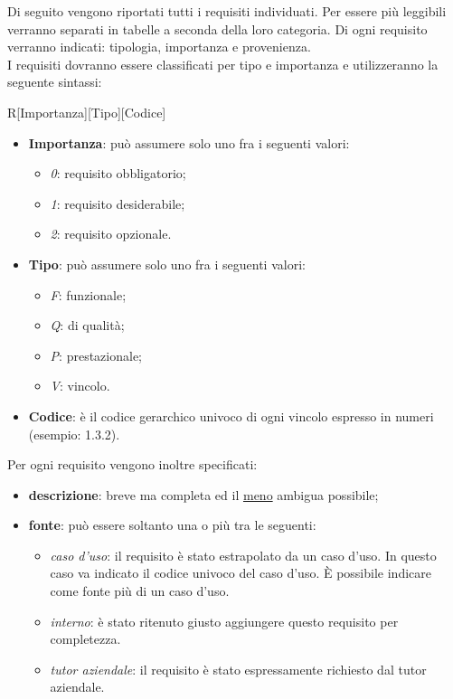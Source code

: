 	Di seguito vengono riportati tutti i requisiti individuati. Per essere più leggibili verranno separati in tabelle a seconda della loro categoria. Di ogni requisito verranno indicati: tipologia, importanza e provenienza.\\
	I requisiti dovranno essere classificati per tipo e importanza e utilizzeranno la seguente sintassi:
	\begin{center}
		R[Importanza][Tipo][Codice]
	\end{center}
	\begin{itemize}
		\item \textbf{Importanza}: può assumere solo uno fra i seguenti valori:
		\begin{itemize}
			\item \textit{0}: requisito obbligatorio;
			\item \textit{1}: requisito desiderabile;
			\item \textit{2}: requisito opzionale.
		\end{itemize}
		\item \textbf{Tipo}: pu\`{o} assumere solo uno fra i seguenti valori:
		\begin{itemize}
			\item  \textit{F}: funzionale;
			\item  \textit{Q}: di qualità;
			\item  \textit{P}: prestazionale;
			\item  \textit{V}: vincolo.
		\end{itemize}
		\item \textbf{Codice}: è il codice gerarchico univoco di ogni vincolo espresso in numeri (esempio: 1.3.2).
	\end{itemize}
	
	Per ogni requisito vengono inoltre specificati:
	\begin{itemize}
		\item \textbf{descrizione}: breve ma completa ed il \underline{meno} ambigua possibile;
		\item \textbf{fonte}: pu\`{o} essere soltanto una o pi\`{u} tra le seguenti:
		\begin{itemize}
			\item \textit{caso d'uso}: il requisito \`{e} stato estrapolato da un caso d'uso. In questo caso va indicato il codice univoco del caso d'uso. \`{E} possibile indicare come fonte pi\`{u} di un caso d'uso.
			\item \textit{interno}: è stato ritenuto giusto aggiungere questo requisito per completezza.
			\item \textit{tutor aziendale}: il requisito è stato espressamente richiesto dal tutor aziendale.
		\end{itemize}
	\end{itemize}
	
